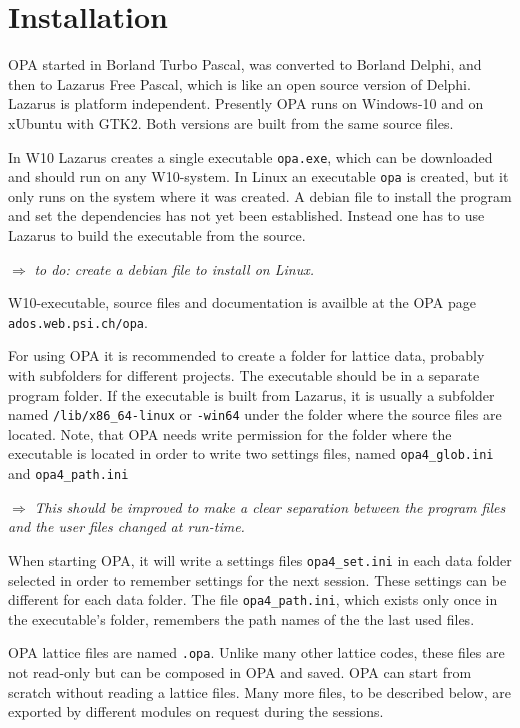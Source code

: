 \documentclass[12pt]{article}
\newcommand\todo[1]{$\Longrightarrow$ {\em #1} }
\begin{document}
\section{Installation}
OPA started in Borland Turbo Pascal, was converted to Borland Delphi, and then to Lazarus Free Pascal, which is like an open source version of Delphi. 
Lazarus is platform independent. Presently OPA runs on Windows-10 and on xUbuntu with GTK2. Both versions are built from the same source files.

In W10 Lazarus creates a single executable {\tt opa.exe}, which can be downloaded and should run on any W10-system.
In Linux an executable {\tt opa} is created, but it only runs on the system where it was created. A debian file
to install the program and set the dependencies has not yet been established. Instead one has to use Lazarus to build the executable from the source.

\todo{to do: create a debian file to install on Linux.}

W10-executable, source files and documentation is availble at the OPA page {\tt ados.web.psi.ch/opa}. 

For using OPA it is recommended to create a folder for lattice data, probably with subfolders for different projects. The executable should be in a separate program folder. If the executable is built from Lazarus, it is usually a subfolder named {\tt /lib/x86\_64-linux} or {\tt -win64} under the folder where the source files are located.
Note, that OPA needs write permission for the folder
where the executable is located in order to write two settings files, named {\tt opa4\_glob.ini} and {\tt opa4\_path.ini}

\todo{This should be improved to make a clear separation between the program files and the user files changed at run-time.}

When starting OPA, it will write a settings files {\tt opa4\_set.ini} in each data folder selected in order to remember settings for the next session. These settings can be different for each data folder. The file {\tt opa4\_path.ini}, which exists only once in the executable's folder, remembers the path names of the the last used files.

OPA lattice files are named {\tt *.opa}. Unlike many other lattice codes, these files are not read-only but can be composed in OPA and saved. OPA can start from scratch without reading a lattice files.
Many more files, to be described below, are exported by different modules on request during the sessions. 
\end{document}
